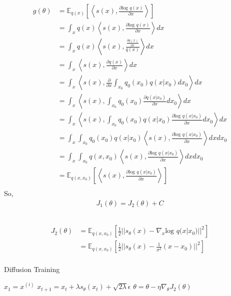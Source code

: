 \documentclass{article}
\newcommand*{\ex}[1]{
    \mathbb{E}_{#1}
}
\begin{document}
\begin{align*}
    g(\theta) 
    &= \ex{q(x)}[\left< s(x), \frac{\partial \text{log }q(x)}{\partial x}\right>]\\
    &= \int_x q(x)\left< s(x), \frac{\partial \text{log }q(x)}{\partial x}\right> dx\\
    &= \int_x q(x)\left< s(x), \frac{\frac{\partial q(x)}{\partial x}}{q(x)}\right> dx\\
    &= \int_x \left< s(x), \frac{\partial q(x)}{\partial x}\right> dx\\
    &= \int_x \left< s(x), \frac{\partial}{\partial x}\int_{x_0} q_0(x_0)q(x|x_0)dx_0\right> dx\\
    &= \int_x \left< s(x), \int_{x_0} q_0(x_0)\frac{\partial q(x|x_0)}{\partial x}dx_0\right> dx\\
    &= \int_x \left< s(x), \int_{x_0} q_0(x_0)q(x|x_0)\frac{\partial \text{log } q(x|x_0)}{\partial x}dx_0\right> dx\\
    &= \int_x \int_{x_0} q_0(x_0)q(x|x_0) \left< s(x), \frac{\partial \text{log } q(x|x_0)}{\partial x}\right> dxdx_0\\
    &= \int_x \int_{x_0} q(x,x_0) \left< s(x), \frac{\partial \text{log } q(x|x_0)}{\partial x}\right> dxdx_0\\
    &= \ex{q(x,x_0)}\left[\left< s(x), \frac{\partial \text{log } q(x|x_0)}{\partial x}\right>\right]\\
\end{align*}
So,
\begin{align*}
    J_1(\theta) = J_2(\theta) + C
\end{align*}
\subsection{}
\begin{align*}
    J_2(\theta) 
    &= \ex{q(x,x_0)}[\frac{1}{2}||s_{\theta}(x) - \nabla_x \text{log } q(x|x_0)||^2]\\
    &= \ex{q(x,x_0)}[\frac{1}{2}||s_{\theta}(x) - \frac{1}{\sigma^2}(x- x_0)||^2]\\
\end{align*}

\begin{algorithm}
    \caption{Diffusion Training}
    \begin{algorithmic}[1]
            \State $x_1 = x^{(i)}$
                \State $x_{t+1} = x_t + \lambda s_{\theta}(x_t) + \sqrt{2\lambda}\epsilon$
                \State $\theta = \theta - \eta \nabla_\theta J_2(\theta)$ 
            \EndFor
        \EndFor
    \end{algorithmic}
\end{algorithm}
\end{document}
